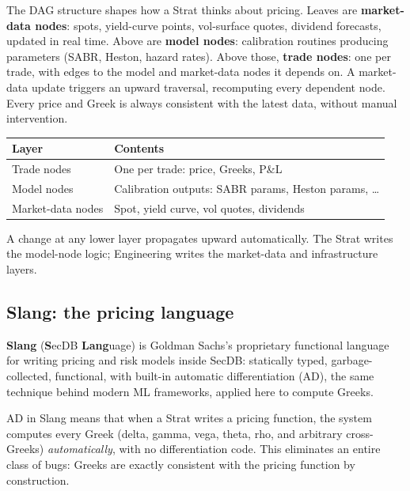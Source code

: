 The DAG structure shapes how a Strat thinks about pricing.  Leaves
are \textbf{market-data nodes}: spots, yield-curve points, vol-surface
quotes, dividend forecasts, updated in real time.  Above are
\textbf{model nodes}: calibration routines producing parameters
(SABR, Heston, hazard rates).  Above those, \textbf{trade nodes}:
one per trade, with edges to the model and market-data nodes it
depends on.  A market-data update triggers an upward traversal,
recomputing every dependent node.  Every price and Greek is always
consistent with the latest data, without manual intervention.

\begin{keyfactbox}
\begin{center}
\begin{tabular}{ll}
\textbf{Layer} & \textbf{Contents} \\
\midrule
Trade nodes     & One per trade: price, Greeks, P\&L \\
Model nodes     & Calibration outputs: SABR params, Heston params, \ldots \\
Market-data nodes & Spot, yield curve, vol quotes, dividends \\
\end{tabular}
\end{center}
A change at any lower layer propagates upward automatically.
The Strat writes the model-node logic; Engineering writes the
market-data and infrastructure layers.
\end{keyfactbox}

\subsection{Slang: the pricing language}

\textbf{Slang} (\textbf{S}ecDB \textbf{Lang}uage) is Goldman Sachs's
proprietary functional language for writing pricing and risk models
inside SecDB: statically typed, garbage-collected, functional, with
built-in automatic differentiation (AD), the same technique
behind modern ML frameworks, applied here to compute Greeks.

\begin{intuitionbox}
AD in Slang means that when a Strat writes a pricing function, the
system computes every Greek (delta, gamma, vega, theta, rho, and
arbitrary cross-Greeks) \emph{automatically}, with no differentiation
code.  This eliminates an entire class of bugs: Greeks are exactly
consistent with the pricing function by construction.
\end{intuitionbox}

